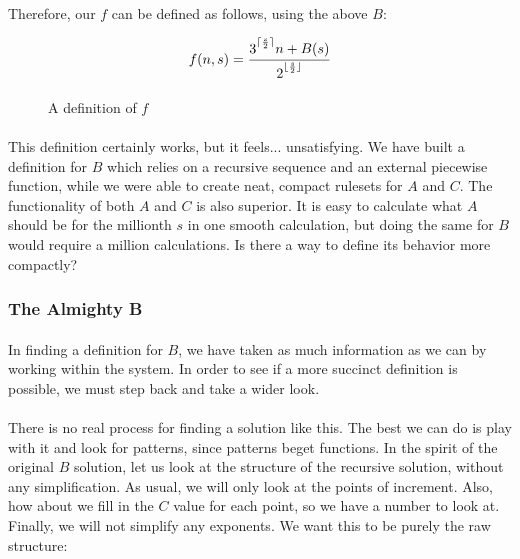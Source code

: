 \documentclass[12pt,letterpaper]{article}
\begin{document}
			\paragraph{} Therefore, our $f$ can be defined as follows, using the above $B$:
			
			\begin{figure}[h]
				\begin{equation*}
					f(n, s) = \frac{3\strut^{\lceil \frac{s}{2} \rceil} n + B(s)}{2\strut^{\lfloor \frac{s}{2} \rfloor}}
				\end{equation*}
				
				\caption{A definition of $f$}
			\end{figure}
		
			\paragraph{} This definition certainly works, but it feels... unsatisfying. We have built a definition for $B$ which relies on a recursive sequence and an external piecewise function, while we were able to create neat, compact rulesets for $A$ and $C$. The functionality of both $A$ and $C$ is also superior. It is easy to calculate what $A$ should be for the millionth $s$ in one smooth calculation, but doing the same for $B$ would require a million calculations. Is there a way to define its behavior more compactly?
			
			
		\subsubsection{The Almighty B}
			
			\paragraph{} In finding a definition for $B$, we have taken as much information as we can by working within the system. In order to see if a more succinct definition is possible, we must step back and take a wider look.
			
			\paragraph{} There is no real process for finding a solution like this. The best we can do is play with it and look for patterns, since patterns beget functions. In the spirit of the original $B$ solution, let us look at the structure of the recursive solution, without any simplification. As usual, we will only look at the points of increment. Also, how about we fill in the $C$ value for each point, so we have a number to look at. Finally, we will not simplify any exponents. We want this to be purely the raw structure:
			
\end{document}
